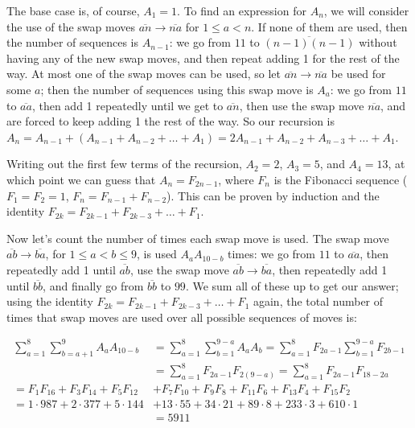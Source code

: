 \documentclass{article}
\begin{document}
\begin{enumerate}
The base case is, of course, $A_1 = 1$. To find an expression for $A_n$, we will consider the use of the swap moves $\overline{an} \rightarrow \overline{na}$ for $1 \le a < n$. If none of them are used, then the number of sequences is $A_{n-1}$: we go from $11$ to $\overline{(n-1)(n-1)}$ without having any of the new swap moves, and then repeat adding 1 for the rest of the way. At most one of the swap moves can be used, so let $\overline{an} \rightarrow \overline{na}$ be used for some $a$; then the number of sequences using this swap move is $A_a$: we go from $11$ to $\overline{aa}$, then add 1 repeatedly until we get to $\overline{an}$, then use the swap move $\overline{na}$, and are forced to keep adding 1 the rest of the way. So our recursion is $A_n = A_{n-1}+(A_{n-1}+A_{n-2}+\ldots+A_1) = 2A_{n-1}+A_{n-2}+A_{n-3}+\ldots+A_1$. 

Writing out the first few terms of the recursion, $A_2 = 2$, $A_3 = 5$, and $A_4 = 13$, at which point we can guess that $A_n = F_{2n-1}$, where $F_n$ is the Fibonacci sequence ($F_1=F_2=1$, $F_n=F_{n-1}+F_{n-2}$). This can be proven by induction and the identity $F_{2k} = F_{2k-1}+F_{2k-3}+\ldots+F_1$.

Now let's count the number of times each swap move is used. The swap move $\overline{ab} \rightarrow \overline{ba}$, for $1 \le a < b \le 9$, is used $A_aA_{10-b}$ times: we go from $11$ to $\overline{aa}$, then repeatedly add 1 until $\overline{ab}$, use the swap move $\overline{ab} \rightarrow \overline{ba}$, then repeatedly add 1 until $\overline{bb}$, and finally go from $\overline{bb}$ to $99$. We sum all of these up to get our answer; using the identity $F_{2k} = F_{2k-1}+F_{2k-3}+\ldots+F_1$ again, the total number of times that swap moves are used over all possible sequences of moves is:

\begin{align*}
    \sum_{a=1}^8 \sum_{b=a+1}^9 A_aA_{10-b} &= \sum_{a=1}^8 \sum_{b=1}^{9-a} A_aA_b = \sum_{a=1}^8 F_{2a-1} \sum_{b=1}^{9-a} F_{2b-1} \\
    &= \sum_{a=1}^8 F_{2a-1}F_{2(9-a)} = \sum_{a=1}^8 F_{2a-1}F_{18-2a} \\ 
    = F_{1}F_{16}+F_{3}F_{14}+F_{5}F_{12}&+F_{7}F_{10}+F_{9}F_{8}+F_{11}F_{6}+F_{13}F_{4}+F_{15}F_{2} \\
    = 1 \cdot 987 + 2 \cdot 377 + 5 \cdot 144 &+ 13 \cdot 55 + 34 \cdot 21 + 89 \cdot 8 + 233 \cdot 3 + 610 \cdot 1 \\
    &= 5\boxed{911}
\end{align*}


\end{enumerate}
\end{document}
